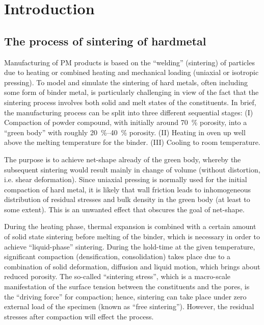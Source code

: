 \documentclass[MikaelDissertation.tex]{subfiles}
\begin{document}
\chapter{Introduction}

\section{The process of sintering of hardmetal}

Manufacturing of PM products is based on the ``welding'' (sintering) of particles due to heating or combined heating and mechanical loading (uniaxial or isotropic pressing).
To model and simulate the sintering of hard metals, often including some form of binder metal, is particularly challenging in view of the fact that the sintering process involves both solid and melt states of the constituents.
In brief, the manufacturing process can be split into three different sequential stages:
(I) Compaction of powder compound, with initially around \SI{70}{\percent} porosity, into a ``green body'' with roughly \SIrange{20}{40}{\percent} porosity.
(II) Heating in oven up well above the melting temperature for the binder.
(III) Cooling to room temperature.

The purpose is to achieve net-shape already of the green body, whereby the subsequent sintering would result mainly in change of volume (without distortion, i.e. shear deformation).
Since uniaxial pressing is normally used for the initial compaction of hard metal, it is likely that wall friction leads to inhomogeneous
distribution of residual stresses and bulk density in the green body (at least to some extent).
This is an unwanted effect that obscures the goal of net-shape.

During the heating phase, thermal expansion is combined with a certain amount of solid state sintering before melting of the binder, which is necessary in order to achieve ``liquid-phase'' sintering.
During the hold-time at the given temperature, significant compaction (densification, consolidation) takes place due to a combination of solid deformation, diffusion and liquid motion, which brings about reduced porosity.
The so-called ``sintering stress'', which is a macro-scale manifestation of the surface tension between the constituents and the pores, is the ``driving force'' for compaction; hence, sintering can take place under zero external load of the specimen (known as ``free sintering'').
However, the residual stresses after compaction will effect the process.
\end{document}
